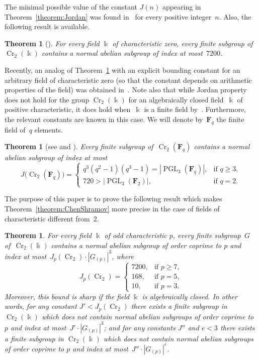 \documentclass[12pt]{amsart}
\numberwithin{equation}{section}
\newtheorem{theorem}[subsection]{Theorem}
\theoremstyle{definition}
\DeclareMathOperator{\Cr}{Cr}
\DeclareMathOperator{\PGL}{PGL}
\def \ge {\geqslant}
\begin{document}
The minimal possible value of the constant $J(n)$ appearing in Theorem~\ref{theorem:Jordan}
was found in~\cite{Collins} for every positive integer~$n$.
Also, the following result is available.

\begin{theorem}[{\cite[Theorem~1.9]{Yasinsky}}]
\label{theorem:Yasinsky}
For every field $\Bbbk$ of characteristic zero, every finite subgroup
of~\mbox{$\Cr_2(\Bbbk)$}
contains a normal abelian subgroup of index at most~$7200$.
\end{theorem}

Recently, an analog of Theorem~\ref{theorem:Yasinsky}
with an explicit bounding constant for an arbitrary field of characteristic zero
(so that the constant depends on arithmetic properties of the field) was
obtained in~\cite{Zaitsev}. Note also
that while Jordan property does not hold for the group $\Cr_2(\Bbbk)$
for an algebraically closed field~$\Bbbk$ of positive characteristic, it does
hold when~$\Bbbk$ is a finite field by~\cite{ProkhorovShramov}.
Furthermore, the relevant constants are known in this case.
We will denote by~$\mathbf{F}_q$ the finite field of~$q$ elements.

\begin{theorem}[{see \cite[Theorem~1.2]{ProkhorovShramov} and \cite[Theorem~1]{Vikulova}}]
Every finite subgroup of~\mbox{$\Cr_2(\mathbf{F}_q)$}
contains a normal abelian subgroup of index at most
$$
J\big(\Cr_2(\mathbf{F}_q)\big)=
\begin{cases}
q^3(q^2-1)(q^3-1)=|\PGL_3(\mathbf{F}_q)|, &\text{if\ } q\ge 3,\\
720>|\PGL_3(\mathbf{F}_2)|, &\text{if\ } q=2.
\end{cases}
$$
\end{theorem}





The purpose of this paper is to prove the following result which makes
Theorem~\ref{theorem:ChenShramov} more precise in the case of fields of characteristic different from~$2$.


\begin{theorem}
\label{theorem:main}
For every field $\Bbbk$ of odd characteristic $p$,
every finite subgroup~$G$
of~\mbox{$\Cr_2(\Bbbk)$}
contains a normal abelian subgroup of order coprime
to $p$ and index at most~\mbox{$J_p(\Cr_2)\cdot |G_{(p)}|^{3}$},
where
$$
J_p(\Cr_2)=
\begin{cases}
7200, &\text{if\ } p\ge 7,\\
168, &\text{if\ } p=5,\\
10, &\text{if\ } p=3.
\end{cases}
$$
Moreover, this bound is sharp if the field $\Bbbk$ is algebraically closed.
In other words, for any constant $J'<J_p(\Cr_2)$
there exists a finite subgroup in $\Cr_2(\Bbbk)$ which does not
contain normal abelian subgroups of
order coprime to $p$ and index at most~\mbox{$J'\cdot |G_{(p)}|^{3}$};
and for any constants $J''$ and $e<3$
there exists a finite subgroup in $\Cr_2(\Bbbk)$ which does not
contain normal abelian subgroups of
order coprime to $p$ and index at most~\mbox{$J''\cdot |G_{(p)}|^{e}$}.
\end{theorem}
\end{document}
